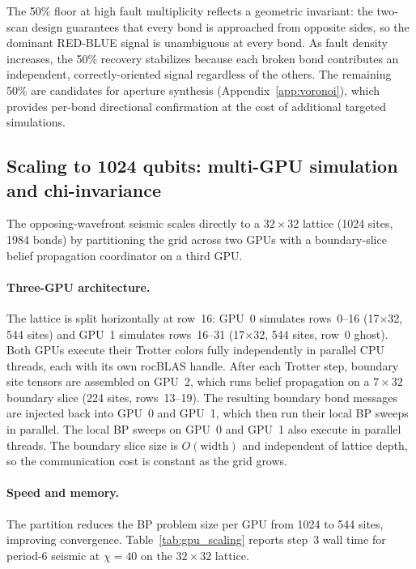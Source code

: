 \documentclass[11pt]{article}
\begin{document}
The 50\% floor at high fault multiplicity reflects a geometric invariant: the
two-scan design guarantees that every bond is approached from opposite sides,
so the dominant RED-BLUE signal is unambiguous at every bond. As fault density
increases, the 50\% recovery stabilizes because each broken bond contributes
an independent, correctly-oriented signal regardless of the others. The
remaining 50\% are candidates for aperture synthesis
(Appendix~\ref{app:voronoi}), which provides per-bond directional confirmation
at the cost of additional targeted simulations.
\subsection{Scaling to 1024 qubits: multi-GPU simulation and chi-invariance}
\label{sec:1024qubits}

The opposing-wavefront seismic scales directly to a $32\times32$ lattice
(1024 sites, 1984 bonds) by partitioning the grid across two GPUs with a
boundary-slice belief propagation coordinator on a third GPU.

\paragraph{Three-GPU architecture.}
The lattice is split horizontally at row~16: GPU~0 simulates rows~0--16
(17$\times$32, 544 sites) and GPU~1 simulates rows~16--31 (17$\times$32,
544 sites, row~0 ghost). Both GPUs execute their Trotter colors fully
independently in parallel CPU threads, each with its own rocBLAS handle.
After each Trotter step, boundary site tensors are assembled on GPU~2,
which runs belief propagation on a $7\times32$ boundary slice (224 sites,
rows~13--19). The resulting boundary bond messages are injected back into
GPU~0 and GPU~1, which then run their local BP sweeps in parallel.
The local BP sweeps on GPU~0 and GPU~1 also execute in parallel threads.
The boundary slice size is $O(\text{width})$ and independent of lattice depth,
so the communication cost is constant as the grid grows.

\paragraph{Speed and memory.}
The partition reduces the BP problem size per GPU from 1024 to 544 sites,
improving convergence. Table~\ref{tab:gpu_scaling} reports step~3 wall time
for period-6 seismic at $\chi=40$ on the $32\times32$ lattice.
\end{document}
